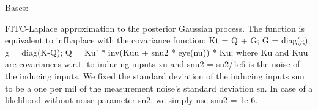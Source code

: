 \documentclass[letterpaper,10pt,english]{sphinxmanual}
\begin{document}

\begin{fulllineitems}
\label{pyGPs.Core:pyGPs.Core.inf.FITC_Laplace}
Bases: {\hyperref[pyGPs.Core:pyGPs.Core.inf.Inference]{}}

FITC-Laplace approximation to the posterior Gaussian process. The function is
equivalent to infLaplace with the covariance function:
Kt = Q + G; G = diag(g); g = diag(K-Q);  Q = Ku' * inv(Kuu + snu2 * eye(nu)) * Ku;
where Ku and Kuu are covariances w.r.t. to inducing inputs xu and
snu2 = sn2/1e6 is the noise of the inducing inputs. We fixed the standard
deviation of the inducing inputs snu to be a one per mil of the measurement 
noise's standard deviation sn. In case of a likelihood without noise
parameter sn2, we simply use snu2 = 1e-6.

\begin{fulllineitems}
\label{pyGPs.Core:pyGPs.Core.inf.FITC_Laplace.proceed}
\end{fulllineitems}


\end{fulllineitems}

\end{document}
